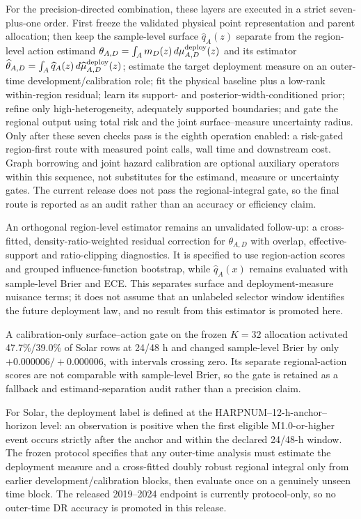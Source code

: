 \documentclass[10pt]{article}
\begin{document}
For the precision-directed combination, these layers are executed in a strict seven-plus-one order. First freeze the validated physical point representation and parent allocation; then keep the sample-level surface $\widehat q_A(z)$ separate from the region-level action estimand $\theta_{A,D}=\int_A m_D(z)\,d\mu_{A,D}^{\rm deploy}(z)$ and its estimator $\widehat\theta_{A,D}=\int_A\widehat q_A(z)\,d\widehat\mu_{A,D}^{\rm deploy}(z)$; estimate the target deployment measure on an outer-time development/calibration role; fit the physical baseline plus a low-rank within-region residual; learn its support- and posterior-width-conditioned prior; refine only high-heterogeneity, adequately supported boundaries; and gate the regional output using total risk and the joint surface--measure uncertainty radius. Only after these seven checks pass is the eighth operation enabled: a risk-gated region-first route with measured point calls, wall time and downstream cost. Graph borrowing and joint hazard calibration are optional auxiliary operators within this sequence, not substitutes for the estimand, measure or uncertainty gates. The current release does not pass the regional-integral gate, so the final route is reported as an audit rather than an accuracy or efficiency claim.

An orthogonal region-level estimator remains an unvalidated follow-up: a cross-fitted, density-ratio-weighted residual correction for $\theta_{A,D}$ with overlap, effective-support and ratio-clipping diagnostics. It is specified to use region-action scores and grouped influence-function bootstrap, while $\widehat q_A(x)$ remains evaluated with sample-level Brier and ECE. This separates surface and deployment-measure nuisance terms; it does not assume that an unlabeled selector window identifies the future deployment law, and no result from this estimator is promoted here.

A calibration-only surface--action gate on the frozen $K=32$ allocation activated 47.7\%/39.0\% of Solar rows at 24/48 h and changed sample-level Brier by only $+0.000006/+0.000006$, with intervals crossing zero. Its separate regional-action scores are not comparable with sample-level Brier, so the gate is retained as a fallback and estimand-separation audit rather than a precision claim.

For Solar, the deployment label is defined at the HARPNUM--12-h-anchor--horizon level: an observation is positive when the first eligible M1.0-or-higher event occurs strictly after the anchor and within the declared 24/48-h window. The frozen protocol specifies that any outer-time analysis must estimate the deployment measure and a cross-fitted doubly robust regional integral only from earlier development/calibration blocks, then evaluate once on a genuinely unseen time block. The released 2019--2024 endpoint is currently protocol-only, so no outer-time DR accuracy is promoted in this release.
\end{document}
